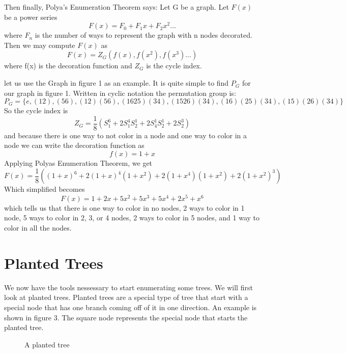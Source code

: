 \documentclass{article}
\begin{document}
Then finally, Polya's Enumeration Theorem says:
Let G be a graph. Let \(F(x)\) be a power series 
\begin{equation}
F(x)=F_0+F_1x+F_2x^2...
\end{equation}
where \(F_n\) is the number of ways to represent the graph with n nodes decorated. Then we may compute \(F(x)\) as
\begin{equation}
F(x)=Z_G(f(x),f(x^2),f(x^3)...)
\end{equation}
where f(x) is the decoration function and \(Z_G\) is the cycle index. 

let us use the Graph in figure 1 as an example. 
It is quite simple to find \(P_G\) for our graph in figure 1. Written in cyclic notation the permutation group is:
\begin{equation}
P_G=\{e,(12),(56),(12)(56),(1625)(34), (1526)(34),(16)(25)(34),(15)(26)(34)\}
\end{equation} 
So the cycle index is
\begin{equation}
Z_G=\frac{1}{8} (S_1^6+2S_1^4S_2^1+2S_4^1S_2^1+2S_2^3)
\end{equation}
 and because there is one way to not color in a node and one way to color in a node we can write the decoration function as
\begin{equation}
f(x)=1+x
\end{equation}
Applying Polyas Enumeration Theorem, we get 
\begin{equation}
F(x)=\frac{1}{8}((1+x)^6+2(1+x)^4(1+x^2)+2(1+x^4)(1+x^2)+2(1+x^2)^3)
\end{equation}
Which simplified becomes
\begin{equation}
F(x)=1+2x+5x^2+5x^3+5x^4+2x^5+x^6
\end{equation}
which tells us that there is one way to color in no nodes, 2 ways to color in 1 node, 5 ways to color in 2, 3, or 4 nodes, 2 ways to  color in 5 nodes, and 1 way to color in all the nodes. 

\section{Planted Trees}
We now have the tools nessessary to start enumerating some trees. We will first look at planted trees. Planted trees are a special type of tree that start with a special node that has one branch coming off of it in one direction. An example is shown in figure 3. The square node represents the special node that starts the planted tree. 
 
\begin{figure}[!h]
\centering
{}
\caption{A planted tree}
\end{figure}
\end{document}
